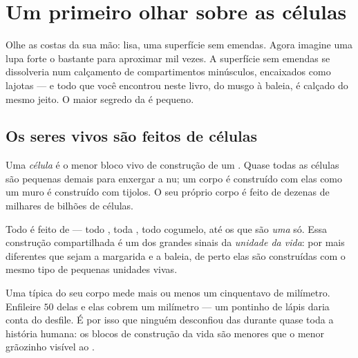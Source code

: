 \chapter{Um primeiro olhar sobre as células}\label{ch:g5:first-look-at-cells}

Olhe as costas da sua mão:  lisa, uma superfície sem emendas.
Agora imagine uma lupa forte o bastante para aproximar mil vezes. A
superfície sem emendas se dissolveria num calçamento de
compartimentos minúsculos, encaixados como lajotas --- e todo  que você encontrou neste livro, do musgo à baleia, é calçado do
mesmo jeito. O maior segredo da  é pequeno.

\section{Os seres vivos são feitos de células}

\begin{definition}[Célula]\label{def:g5:first-look-at-cells:cell}
Uma \emph{célula} é o menor bloco vivo de construção de
um . Quase todas as células são pequenas demais para
enxergar a  nu; um corpo é construído com elas como um muro é
construído com tijolos. O seu próprio corpo é feito de dezenas de
milhares de bilhões de células.
\end{definition}

\begin{proposition}\label{prop:g5:first-look-at-cells:principle}
Todo  é feito de  --- todo , toda , todo
cogumelo, até os  que são \emph{uma}  só. Essa
construção compartilhada é um dos grandes sinais da \emph{unidade da
vida}: por mais diferentes que sejam a
margarida e a baleia, de perto elas são construídas com o mesmo tipo
de pequenas unidades vivas.
\end{proposition}
\admitted

\begin{example}\label{ex:g5:first-look-at-cells:small}
Uma  típica do seu corpo mede mais ou menos um cinquentavo de
milímetro. Enfileire $50$ delas e elas cobrem um milímetro --- um
pontinho de lápis daria conta do desfile. É por isso que ninguém
desconfiou das  durante quase toda a história humana: os
blocos de construção da vida são menores que o menor grãozinho
visível ao .
\end{example}

